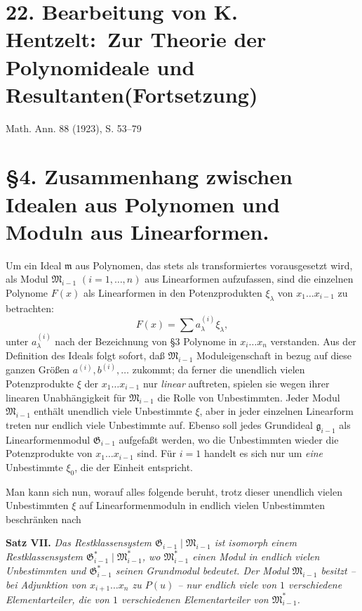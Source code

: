 \documentclass[11pt]{article}
\providecommand{\Gmod}{\mathfrak G}
\providecommand{\Mmod}{\mathfrak M}
\providecommand{\mideal}{\mathfrak m}
\providecommand{\gideal}{\mathfrak g}
\begin{document}
\setcounter{footnote}{0}

\section*{22. Bearbeitung von K. Hentzelt:\ Zur Theorie der Polynomideale und Resultanten\quad (Fortsetzung)}
\begin{center}
Math. Ann. 88 (1923), S. 53--79
\end{center}

\section*{\S 4. Zusammenhang zwischen Idealen aus Polynomen und Moduln aus Linearformen.}

Um ein Ideal $\mideal$ aus Polynomen, das stets als transformiertes vorausgesetzt wird, als Modul $\Mmod_{i-1}$ $(i=1,\ldots,n)$ aus Linearformen aufzufassen, sind die einzelnen Polynome $F(x)$ als Linearformen in den Potenzprodukten $\xi_\lambda$ von $x_1\ldots x_{i-1}$ zu betrachten:
\[
  F(x)=\sum a^{(i)}_\lambda\xi_\lambda,
\]
unter $a^{(i)}_\lambda$ nach der Bezeichnung von \S 3 Polynome in $x_i\ldots x_n$ verstanden. Aus der Definition des Ideals folgt sofort, daß $\Mmod_{i-1}$ Moduleigenschaft in bezug auf diese ganzen Größen $a^{(i)}, b^{(i)},\ldots$ zukommt; da ferner die unendlich vielen Potenzprodukte $\xi$ der $x_1\ldots x_{i-1}$ nur \emph{linear} auftreten, spielen sie wegen ihrer linearen Unabhängigkeit für $\Mmod_{i-1}$ die Rolle von Unbestimmten. Jeder Modul $\Mmod_{i-1}$ enthält unendlich viele Unbestimmte $\xi$, aber in jeder einzelnen Linearform treten nur endlich viele Unbestimmte auf. Ebenso soll jedes Grundideal $\gideal_{i-1}$ als Linearformenmodul $\Gmod_{i-1}$ aufgefaßt werden, wo die Unbestimmten wieder die Potenzprodukte von $x_1\ldots x_{i-1}$ sind. Für $i=1$ handelt es sich nur um \emph{eine} Unbestimmte $\xi_0$, die der Einheit entspricht.

Man kann sich nun, worauf alles folgende beruht, trotz dieser unendlich vielen Unbestimmten $\xi$ auf Linearformenmoduln in endlich vielen Unbestimmten beschränken nach

\medskip
\noindent\textbf{Satz VII.} \emph{Das Restklassensystem $\Gmod_{i-1}\mid \Mmod_{i-1}$ ist isomorph einem Restklassensystem $\Gmod^*_{i-1}\mid \Mmod^*_{i-1}$, wo $\Mmod^*_{i-1}$ einen Modul in endlich vielen Unbestimmten und $\Gmod^*_{i-1}$ seinen Grundmodul bedeutet. Der Modul $\Mmod_{i-1}$ besitzt -- bei Adjunktion von $x_{i+1}\ldots x_n$ zu $P(u)$ -- nur endlich viele von $1$ verschiedene Elementarteiler, die von $1$ verschiedenen Elementarteiler von $\Mmod^*_{i-1}$.}
\end{document}
